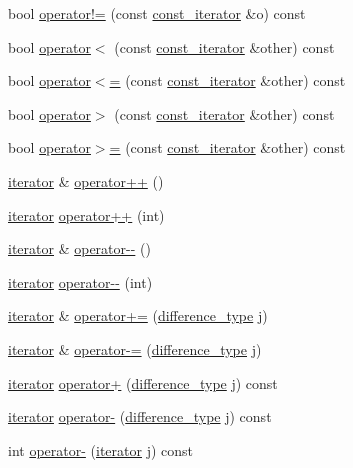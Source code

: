 \begin{DoxyCompactItemize}
\item 
bool \hyperlink{class_q_list_1_1iterator_ab3cfcd15a1b076ca1870d2ca72d72b6a}{operator!=} (const \hyperlink{class_q_list_1_1const__iterator}{const\+\_\+iterator} \&o) const 
\item 
bool \hyperlink{class_q_list_1_1iterator_ada8c924f9a031ca2a6d0533b79478018}{operator$<$} (const \hyperlink{class_q_list_1_1const__iterator}{const\+\_\+iterator} \&other) const 
\item 
bool \hyperlink{class_q_list_1_1iterator_a3a7695c52445c55c001e3b032ee781ab}{operator$<$=} (const \hyperlink{class_q_list_1_1const__iterator}{const\+\_\+iterator} \&other) const 
\item 
bool \hyperlink{class_q_list_1_1iterator_a1942047973479c54ea3554424be4a74b}{operator$>$} (const \hyperlink{class_q_list_1_1const__iterator}{const\+\_\+iterator} \&other) const 
\item 
bool \hyperlink{class_q_list_1_1iterator_abfe3b9e2786ce7ee96d4d269d52f2f64}{operator$>$=} (const \hyperlink{class_q_list_1_1const__iterator}{const\+\_\+iterator} \&other) const 
\item 
\hyperlink{class_q_list_1_1iterator}{iterator} \& \hyperlink{class_q_list_1_1iterator_ad7945f61e486c6a104042f57ced0abc3}{operator++} ()
\item 
\hyperlink{class_q_list_1_1iterator}{iterator} \hyperlink{class_q_list_1_1iterator_aed330ca786943bab5ad53c7647aabdef}{operator++} (int)
\item 
\hyperlink{class_q_list_1_1iterator}{iterator} \& \hyperlink{class_q_list_1_1iterator_a7a5a35f25f1839b985d897464ac2d44e}{operator-\/-\/} ()
\item 
\hyperlink{class_q_list_1_1iterator}{iterator} \hyperlink{class_q_list_1_1iterator_a8b004cb6aea3fe5eead5a2db1fe826b0}{operator-\/-\/} (int)
\item 
\hyperlink{class_q_list_1_1iterator}{iterator} \& \hyperlink{class_q_list_1_1iterator_ac7f1c22e07d7d8d70012bd622cff86d7}{operator+=} (\hyperlink{class_q_list_1_1iterator_a6360336f54f546a21d69e233f8334fc5}{difference\+\_\+type} j)
\item 
\hyperlink{class_q_list_1_1iterator}{iterator} \& \hyperlink{class_q_list_1_1iterator_ab46618ab9d6063adcde81007c79a8d3f}{operator-\/=} (\hyperlink{class_q_list_1_1iterator_a6360336f54f546a21d69e233f8334fc5}{difference\+\_\+type} j)
\item 
\hyperlink{class_q_list_1_1iterator}{iterator} \hyperlink{class_q_list_1_1iterator_abaf2621f9687beef6fb25383c6919cb3}{operator+} (\hyperlink{class_q_list_1_1iterator_a6360336f54f546a21d69e233f8334fc5}{difference\+\_\+type} j) const 
\item 
\hyperlink{class_q_list_1_1iterator}{iterator} \hyperlink{class_q_list_1_1iterator_a1ef9ddcbeb387df3984f74b9588af2e9}{operator-\/} (\hyperlink{class_q_list_1_1iterator_a6360336f54f546a21d69e233f8334fc5}{difference\+\_\+type} j) const 
\item 
int \hyperlink{class_q_list_1_1iterator_a9cc15e0eacc43cfa2017d54d310cf10b}{operator-\/} (\hyperlink{class_q_list_1_1iterator}{iterator} j) const 
\end{DoxyCompactItemize}
